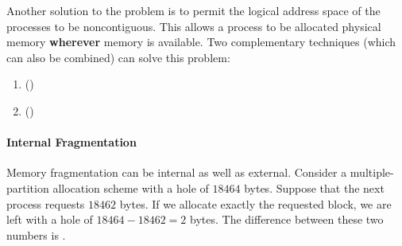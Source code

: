 Another solution to the  problem is to permit the logical address space of the processes to be noncontiguous.
This allows a process to be allocated physical memory \textbf{wherever} memory is available.
Two complementary techniques (which can also be combined) can solve this problem:
\begin{enumerate}[noitemsep]
\item {} ()
\item {} ()
\end{enumerate}

\paragraph{Internal Fragmentation}\label{par:Internal_Fragmentation}
Memory fragmentation can be internal as well as external.
Consider a multiple-partition allocation scheme with a hole of $18464$ bytes.
Suppose that the next process requests $18462$ bytes.
If we allocate exactly the requested block, we are left with a hole of $18464-18462 = 2$ bytes.
The difference between these two numbers is .


